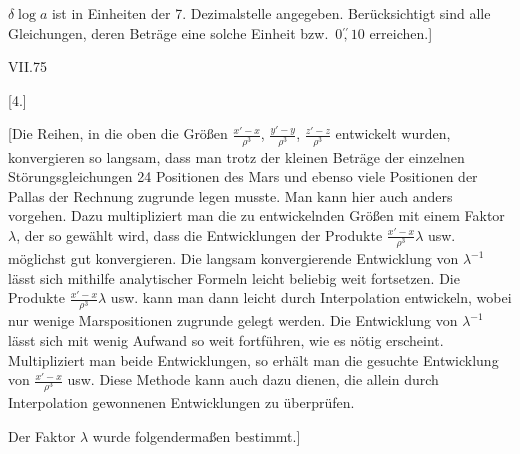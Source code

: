 \par\noindent\hspace*{\parindent}\(\delta\log a\) ist in Einheiten der 7. Dezimalstelle angegeben. Berücksichtigt sind alle Gleichungen, deren Beträge
eine solche Einheit bzw.\ \(0\overset{\prime\prime}{,}10\) erreichen.]
\par\smallskip\noindent VII.\hfill 75\par
\par\endgroup

\par\medskip
{}
\begin{center}[4.]\end{center}
\begingroup
\small
\par\noindent\hspace*{\parindent}[Die Reihen, in die oben die Größen \(\frac{x'-x}{\rho^3}\), \(\frac{y'-y}{\rho^3}\), \(\frac{z'-z}{\rho^3}\) entwickelt wurden,
konvergieren so langsam, dass man trotz der kleinen Beträge der einzelnen Störungsgleichungen 24 Positionen des Mars
und ebenso viele Positionen der Pallas der Rechnung zugrunde legen musste. Man kann hier auch anders vorgehen.
Dazu multipliziert man die zu entwickelnden Größen mit einem Faktor \(\lambda\),
der so gewählt wird, dass die Entwicklungen der Produkte \(\frac{x'-x}{\rho^3}\lambda\) usw. möglichst gut konvergieren.
Die langsam konvergierende Entwicklung von \(\lambda^{-1}\) lässt sich mithilfe analytischer
Formeln leicht beliebig weit fortsetzen. Die Produkte \(\frac{x'-x}{\rho^3}\lambda\) usw. kann man dann leicht durch Interpolation entwickeln,
wobei nur wenige Marspositionen zugrunde gelegt werden. Die Entwicklung von \(\lambda^{-1}\) lässt sich mit
wenig Aufwand so weit fortführen, wie es nötig erscheint. Multipliziert man beide Entwicklungen, so erhält man
die gesuchte Entwicklung von \(\frac{x'-x}{\rho^3}\) usw. Diese Methode kann auch dazu dienen, die allein durch Interpolation
gewonnenen Entwicklungen zu überprüfen.
\par\noindent\hspace*{\parindent}Der Faktor \(\lambda\) wurde folgendermaßen bestimmt.]
\par\endgroup
\clearpage
\endgroup
